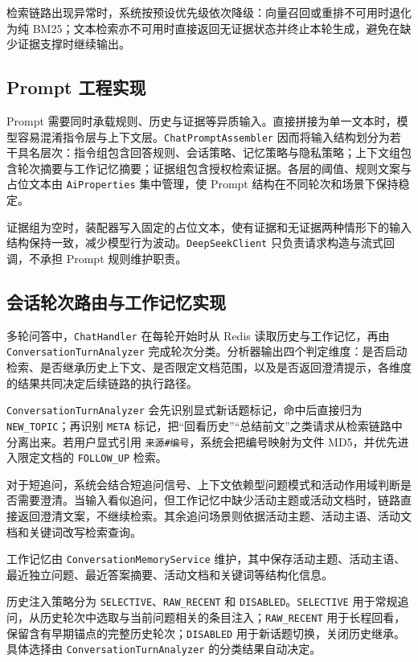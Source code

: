 检索链路出现异常时，系统按预设优先级依次降级：向量召回或重排不可用时退化为纯 BM25；文本检索亦不可用时直接返回无证据状态并终止本轮生成，避免在缺少证据支撑时继续输出。

\subsection{Prompt 工程实现}

Prompt 需要同时承载规则、历史与证据等异质输入。直接拼接为单一文本时，模型容易混淆指令层与上下文层。\texttt{ChatPromptAssembler} 因而将输入结构划分为若干具名层次：指令组包含回答规则、会话策略、记忆策略与隐私策略；上下文组包含轮次摘要与工作记忆摘要；证据组包含授权检索证据。各层的阈值、规则文案与占位文本由 \texttt{AiProperties} 集中管理，使 Prompt 结构在不同轮次和场景下保持稳定。

证据组为空时，装配器写入固定的占位文本，使有证据和无证据两种情形下的输入结构保持一致，减少模型行为波动。\texttt{DeepSeekClient} 只负责请求构造与流式回调，不承担 Prompt 规则维护职责。

\subsection{会话轮次路由与工作记忆实现}

多轮问答中，\texttt{ChatHandler} 在每轮开始时从 Redis 读取历史与工作记忆，再由 \texttt{ConversationTurnAnalyzer} 完成轮次分类。分析器输出四个判定维度：是否启动检索、是否继承历史上下文、是否限定文档范围，以及是否返回澄清提示，各维度的结果共同决定后续链路的执行路径。

\texttt{ConversationTurnAnalyzer} 会先识别显式新话题标记，命中后直接归为 \texttt{NEW\_TOPIC}；再识别 \texttt{META} 标记，把“回看历史”“总结前文”之类请求从检索链路中分离出来。若用户显式引用 \texttt{来源\#编号}，系统会把编号映射为文件 MD5，并优先进入限定文档的 \texttt{FOLLOW\_UP} 检索。

对于短追问，系统会结合短追问信号、上下文依赖型问题模式和活动作用域判断是否需要澄清。当输入看似追问，但工作记忆中缺少活动主题或活动文档时，链路直接返回澄清文案，不继续检索。其余追问场景则依据活动主题、活动主语、活动文档和关键词改写检索查询。

工作记忆由 \texttt{ConversationMemoryService} 维护，其中保存活动主题、活动主语、最近独立问题、最近答案摘要、活动文档和关键词等结构化信息。

历史注入策略分为 \texttt{SELECTIVE}、\texttt{RAW\_RECENT} 和 \texttt{DISABLED}。\texttt{SELECTIVE} 用于常规追问，从历史轮次中选取与当前问题相关的条目注入；\texttt{RAW\_RECENT} 用于长程回看，保留含有早期锚点的完整历史轮次；\texttt{DISABLED} 用于新话题切换，关闭历史继承。具体选择由 \texttt{ConversationTurnAnalyzer} 的分类结果自动决定。

